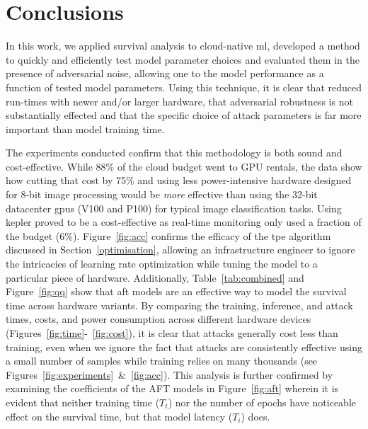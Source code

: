 \documentclass[sn-mathphys-num]{sn-jnl}%
\begin{document}
\section{Conclusions}
\label{conclusion}

In this work, we applied survival analysis to cloud-native \acrshort{ml}, developed a method to quickly and efficiently test model parameter choices and evaluated them in the presence of adversarial noise, allowing one to the model performance as a function of tested model parameters.
Using this technique, it is clear that reduced run-times with newer and/or larger hardware, that adversarial robustness is not substantially effected and that the specific choice of attack parameters is far more important than model training time. 

The experiments conducted confirm that this methodology is both sound and cost-effective. While 88\% of the cloud budget went to GPU rentals, the data show how cutting that cost by 75\% and using less power-intensive hardware designed for 8-bit image processing would be \textit{more} effective than using the 32-bit datacenter \acrshort{gpu}s (V100 and P100) for typical image classification tasks. Using \acrshort{kepler} proved to be a cost-effective as real-time monitoring only used a fraction of the budget (6\%). 
Figure~\ref{fig:acc} confirms the efficacy of the \acrshort{tpe} algorithm discussed in Section~\ref{optimisation}, allowing an infrastructure engineer to ignore the intricacies of learning rate optimization while tuning the model to a particular piece of hardware. 
Additionally, Table~\ref{tab:combined} and Figure~\ref{fig:qq} show that \acrshort{aft} models are an effective way to model the survival time across hardware variants. 
By comparing the training, inference, and attack  times, costs, and power consumption across different hardware devices (Figures~\ref{fig:time}-~\ref{fig:cost}), it is clear that attacks generally cost less than training, even when we ignore the fact that attacks are consistently effective using a small number of samples while training relies on many thousands (see Figures~\ref{fig:experiments}~\&~\ref{fig:acc}).
This analysis is further confirmed by examining the coefficients of the AFT models in Figure~\ref{fig:aft} wherein it is evident that neither training time ($T_t$) nor the number of epochs have noticeable effect on the survival time, but that model latency ($T_i$) does. 
\end{document}
